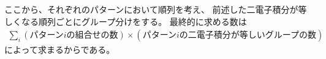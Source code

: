 ここから、それぞれのパターンにおいて順列を考え、
前述した二電子積分が等しくなる順列ごとにグループ分けをする。
最終的に求める数は
\begin{align}
	\sum_i
		(\text{パターン$i$の組合せの数})\times
		(\text{パターン$i$の二電子積分が等しいグループの数})
\end{align}
によって求まるからである。








